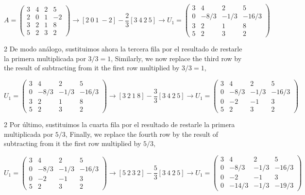 \begin{equation*}
A=\begin{pmatrix}
3& 4& 2&5\\
2& 0& 1& -2\\
3& 2& 1& 8\\
5& 2& 3& 2
\end{pmatrix} \rightarrow [2\ 0\ 1\ -2]-\frac{2}{3} [3\ 4\ 2\ 5] \rightarrow U_1=\begin{pmatrix}
3& 4& 2&5\\
0& -8/3& -1/3& -16/3\\
3& 2& 1& 8\\
5& 2& 3& 2
\end{pmatrix}
\end{equation*}

\begin{paracol}{2}
De modo análogo, sustituimos ahora la tercera fila por el resultado de restarle la primera multiplicada por $3/3=1$,
\switchcolumn
Similarly, we now replace the third row by the result of subtracting from it the first row multiplied by $3/3=1$,
\end{paracol}

\begin{equation*}
U_1=\begin{pmatrix}
3& 4& 2&5\\
0& -8/3& -1/3& -16/3\\
3& 2& 1& 8\\
5& 2& 3& 2
\end{pmatrix} \rightarrow [3\ 2\ 1\ 8]-\frac{3}{3} [3\ 4\ 2\ 5] \rightarrow U_1=\begin{pmatrix}
3& 4& 2&5\\
0& -8/3& -1/3& -16/3\\
0& -2& -1& 3\\
5& 2& 3& 2
\end{pmatrix}
\end{equation*}

\begin{paracol}{2}
Por último, sustituimos la cuarta fila por el resultado de restarle la primera multiplicada por $5/3$,
\switchcolumn
Finally, we replace the fourth row by the result of subtracting from it the first row multiplied by $5/3$,
\end{paracol}

\begin{equation*}
U_1=\begin{pmatrix}
3& 4& 2&5\\
0& -8/3& -1/3& -16/3\\
0& -2& -1& 3\\
5& 2& 3& 2
\end{pmatrix} \rightarrow [5\ 2\ 3\ 2]-\frac{5}{3} [3\ 4\ 2\ 5] \rightarrow U_1=\begin{pmatrix}
3& 4& 2&5\\
0& -8/3& -1/3& -16/3\\
0& -2& -1& 3\\
0& -14/3& -1/3& -19/3
\end{pmatrix}
\end{equation*}

